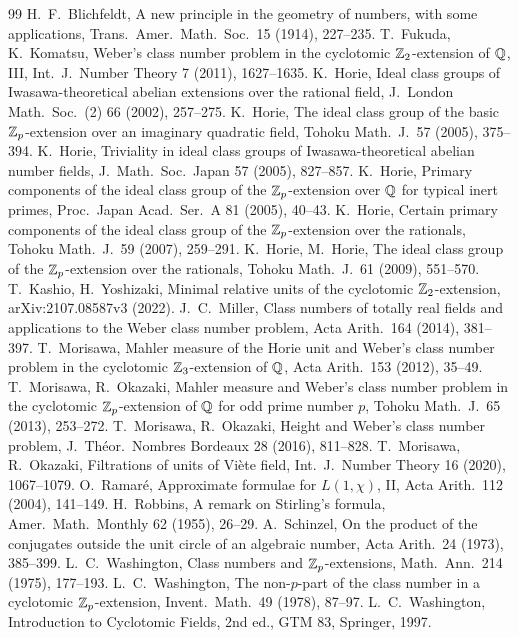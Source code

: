 \begin{thebibliography}{99}
 H.~F.~Blichfeldt, A new principle in the geometry of numbers, with some applications, Trans.\ Amer.\ Math.\ Soc.\ 15 (1914), 227--235.
 T.~Fukuda, K.~Komatsu, Weber's class number problem in the cyclotomic $\mathbb{Z}_2$-extension of $\mathbb{Q}$, III, Int.\ J.\ Number Theory 7 (2011), 1627--1635.
 K.~Horie, Ideal class groups of Iwasawa-theoretical abelian extensions over the rational field, J.\ London Math.\ Soc.\ (2) 66 (2002), 257--275.
 K.~Horie, The ideal class group of the basic $\mathbb{Z}_p$-extension over an imaginary quadratic field, Tohoku Math.\ J.\ 57 (2005), 375--394.
 K.~Horie, Triviality in ideal class groups of Iwasawa-theoretical abelian number fields, J.\ Math.\ Soc.\ Japan 57 (2005), 827--857.
 K.~Horie, Primary components of the ideal class group of the $\mathbb{Z}_p$-extension over $\mathbb{Q}$ for typical inert primes, Proc.\ Japan Acad.\ Ser.\ A 81 (2005), 40--43.
 K.~Horie, Certain primary components of the ideal class group of the $\mathbb{Z}_p$-extension over the rationals, Tohoku Math.\ J.\ 59 (2007), 259--291.
 K.~Horie, M.~Horie, The ideal class group of the $\mathbb{Z}_p$-extension over the rationals, Tohoku Math.\ J.\ 61 (2009), 551--570.
 T.~Kashio, H.~Yoshizaki, Minimal relative units of the cyclotomic $\mathbb{Z}_2$-extension, arXiv:2107.08587v3 (2022).
 J.~C.~Miller, Class numbers of totally real fields and applications to the Weber class number problem, Acta Arith.\ 164 (2014), 381--397.
 T.~Morisawa, Mahler measure of the Horie unit and Weber's class number problem in the cyclotomic $\mathbb{Z}_3$-extension of $\mathbb{Q}$, Acta Arith.\ 153 (2012), 35--49.
 T.~Morisawa, R.~Okazaki, Mahler measure and Weber's class number problem in the cyclotomic $\mathbb{Z}_p$-extension of $\mathbb{Q}$ for odd prime number $p$, Tohoku Math.\ J.\ 65 (2013), 253--272.
 T.~Morisawa, R.~Okazaki, Height and Weber's class number problem, J.\ Th\'eor.\ Nombres Bordeaux 28 (2016), 811--828.
 T.~Morisawa, R.~Okazaki, Filtrations of units of Vi\`ete field, Int.\ J.\ Number Theory 16 (2020), 1067--1079.
 O.~Ramar\'e, Approximate formulae for $L(1,\chi)$, II, Acta Arith.\ 112 (2004), 141--149.
 H.~Robbins, A remark on Stirling's formula, Amer.\ Math.\ Monthly 62 (1955), 26--29.
 A.~Schinzel, On the product of the conjugates outside the unit circle of an algebraic number, Acta Arith.\ 24 (1973), 385--399.
 L.~C.~Washington, Class numbers and $\mathbb{Z}_p$-extensions, Math.\ Ann.\ 214 (1975), 177--193.
 L.~C.~Washington, The non-$p$-part of the class number in a cyclotomic $\mathbb{Z}_p$-extension, Invent.\ Math.\ 49 (1978), 87--97.
 L.~C.~Washington, Introduction to Cyclotomic Fields, 2nd ed., GTM 83, Springer, 1997.
\end{thebibliography}
